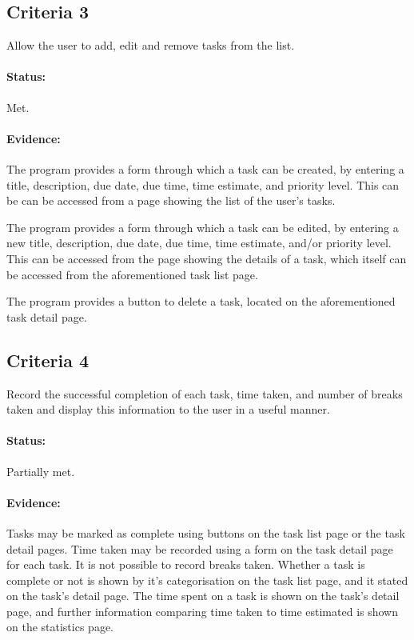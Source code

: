 \documentclass{article}
\begin{document}
\subsection{Criteria 3}
Allow the user to add, edit and remove tasks from the list.

\paragraph{Status:}
Met.

\paragraph{Evidence:}
The program provides a form through which a task can be created,
by entering a title,
description,
due date,
due time,
time estimate,
and priority level.
This can be can be accessed from a page showing the list of the user's tasks.

The program provides a form through which a task can be edited,
by entering a new title,
description,
due date,
due time,
time estimate,
and/or priority level.
This can be accessed from the page showing the details of a task,
which itself can be accessed from the aforementioned task list page.

The program provides a button to delete a task,
located on the aforementioned task detail page.

\subsection{Criteria 4}
Record the successful completion of each task, time taken,
and number of breaks taken and display this information to the user in a useful manner.

\paragraph{Status:}
Partially met.

\paragraph{Evidence:}
Tasks may be marked as complete using buttons on the task list page or the task detail pages.
Time taken may be recorded using a form on the task detail page for each task.
It is not possible to record breaks taken.
Whether a task is complete or not is shown by it's categorisation on the task list page,
and it stated on the task's detail page.
The time spent on a task is shown on the task's detail page,
and further information comparing time taken to time estimated is shown on the statistics page.
\end{document}
